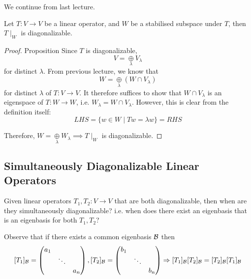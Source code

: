 
We continue from last lecture.
\begin{proposition}
    Let \(T: V \to V\) be a linear operator, and \(W\) be a stabilised subspace under \(T\), then \(T\mid_W\) is diagonalizable.
\end{proposition}

\begin{proof} {Proposition}
    Since \(T\) is diagonalizable, \[
        V = \underset{\lambda}{\oplus} V_{\lambda}
    \] for distinct \(\lambda\). From previous lecture, we know that \[
        W = \underset{\lambda}{\oplus} (W \cap V_\lambda)
    \] for distinct \(\lambda\) of \(T: V \to V\). It therefore suffices to show that \(W \cap V_\lambda\) is an eigenspace of \(T: W \to W\), i.e. \(W_\lambda = W \cap V_\lambda\). However, this is clear from the definition itself: \[
        LHS = \{w \in W \mid Tw = \lambda w\} = RHS
    \]

    Therefore, \( W = \underset{\lambda}{\oplus} W_\lambda \implies T\mid_W\) is diagonalizable.
\end{proof}

\subsection{Simultaneously Diagonalizable Linear Operators}
\begin{question}
    Given linear operators \(T_1, T_2: V \to V\) that are both diagonalizable, then when are they simultaneously diagonalizable? i.e. when does there exist an eigenbasis that is an eigenbasis for both \(T_1, T_2\)?
\end{question}

Observe that if there exists a common eigenbasis \(\mathcal{B}\) then \[
    [T_1]_{\mathcal{B}} = \begin{pmatrix}
        a_1 &        &     \\
            & \ddots &     \\
            &        & a_n
    \end{pmatrix}, [T_2]_{\mathcal{B}} = \begin{pmatrix}
        b_1 &        &     \\
            & \ddots &     \\
            &        & b_n
    \end{pmatrix}
    \Rightarrow [T_1]_{\mathcal{B}} [T_2]_{\mathcal{B}} = [T_2]_{\mathcal{B}} [T_1]_{\mathcal{B}}
\]


